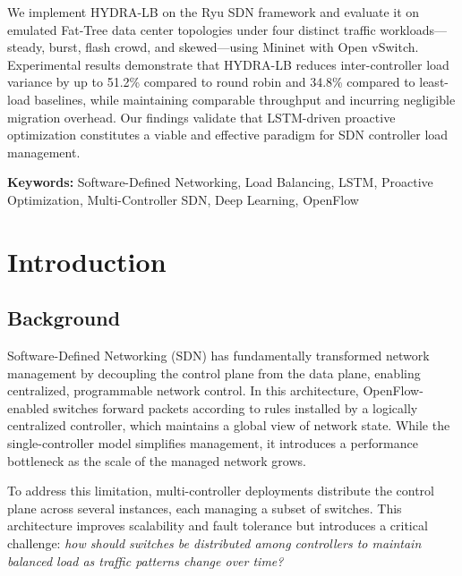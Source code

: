 \documentclass[12pt,a4paper]{report}
\begin{document}
We implement HYDRA-LB on the Ryu SDN framework and evaluate it on emulated Fat-Tree data center topologies under four distinct traffic workloads---steady, burst, flash crowd, and skewed---using Mininet with Open vSwitch. Experimental results demonstrate that HYDRA-LB reduces inter-controller load variance by up to 51.2\% compared to round robin and 34.8\% compared to least-load baselines, while maintaining comparable throughput and incurring negligible migration overhead. Our findings validate that LSTM-driven proactive optimization constitutes a viable and effective paradigm for SDN controller load management.

\vspace{0.5cm}
\noindent \textbf{Keywords:} Software-Defined Networking, Load Balancing, LSTM, Proactive Optimization, Multi-Controller SDN, Deep Learning, OpenFlow

\newpage
\tableofcontents

\newpage
\setcounter{page}{1}

\chapter{Introduction}

\section{Background}

Software-Defined Networking (SDN) has fundamentally transformed network management by decoupling the control plane from the data plane, enabling centralized, programmable network control. In this architecture, OpenFlow-enabled switches forward packets according to rules installed by a logically centralized controller, which maintains a global view of network state. While the single-controller model simplifies management, it introduces a performance bottleneck as the scale of the managed network grows.

To address this limitation, multi-controller deployments distribute the control plane across several instances, each managing a subset of switches. This architecture improves scalability and fault tolerance but introduces a critical challenge: \textit{how should switches be distributed among controllers to maintain balanced load as traffic patterns change over time?}
\end{document}
